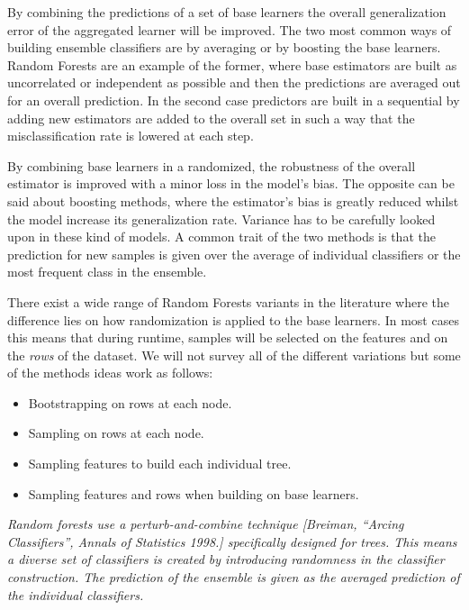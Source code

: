\documentclass{article}%
\theoremstyle{definition}
\begin{document}
	
	
	By combining the predictions of a set of base learners the overall generalization error of the aggregated learner will be improved. The two most common ways of building ensemble classifiers are by averaging or by boosting the base learners. Random Forests are an example of the former, where base estimators are built as uncorrelated or independent as possible and then the predictions are averaged out for an overall prediction. In the second case predictors are built in a sequential by adding new estimators are added to the overall set in such a way that the misclassification rate is lowered at each step.
	
	By combining base learners in a randomized, the robustness of the overall estimator is improved with a minor loss in the model's bias. The opposite can be said about boosting methods, where the estimator's bias is greatly reduced whilst the model increase its generalization rate. Variance has to be carefully looked upon in these kind of models. A common trait of the two methods is that the prediction for new samples is given over the average of individual classifiers or the most frequent class in the ensemble. 
	
	There exist a wide range of Random Forests variants in the literature \cite{breiman-randomforests} where the difference lies on how randomization is applied to the base learners. In most cases this means that during runtime, samples will be selected on the features and on the \textit{rows} of the dataset. We will not survey all of the different variations but some of the methods ideas work as follows:
	
	\begin{itemize}
		\item Bootstrapping on rows at each node.
		\item Sampling on rows at each node.
		\item Sampling features to build each individual tree.
		\item Sampling features and rows when building on base learners.
	\end{itemize}
	
	
	\textit{Random forests use a perturb-and-combine technique [Breiman, “Arcing Classifiers”, Annals of Statistics 1998.] specifically designed for trees. This means a diverse set of classifiers is created by introducing randomness in the classifier construction. The prediction of the ensemble is given as the averaged prediction of the individual classifiers.}
	
\end{document}
